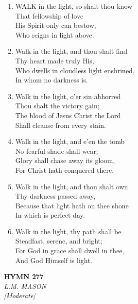 \documentclass[11pt,a4paper]{article}
\begin{document}
\begin{enumerate}
    \item WALK in the light, so shalt thou know \\
        That fellowship of love \\
        His Spirit only can bestow, \\
        Who reigns in light above.

    \item Walk in the light, and thou shalt find \\
        Thy heart made truly His, \\
        Who dwells in cloudless light enshrined, \\
        In whom no darkness is.

    \item Walk in the light, o'er sin abhorred \\
        Thou shalt the victory gain; \\
        The blood of Jesus Christ the Lord \\
        Shall cleanse from every stain.

    \item Walk in the light, and e'en the tomb \\
        No fearful shade shall wear; \\
        Glory shall chase away its gloom, \\
        For Christ hath conquered there.

    \item Walk in the light, and thou shalt own \\
        Thy darkness passed away, \\
        Because that light hath on thee shone \\
        In which is perfect day.

    \item Walk in the light, thy path shall be \\
        Steadfast, serene, and bright; \\
        For God in grace shall dwell in thee, \\
        And God Himself is light.

\end{enumerate}

\newpage
\begin{center}
    {\Large \textbf{HYMN 277}}
    \\
    \textit{L.M. MASON}
    \\
    \textit{\small [Moderate]}
\end{center}
\vspace{1em}
\end{document}
